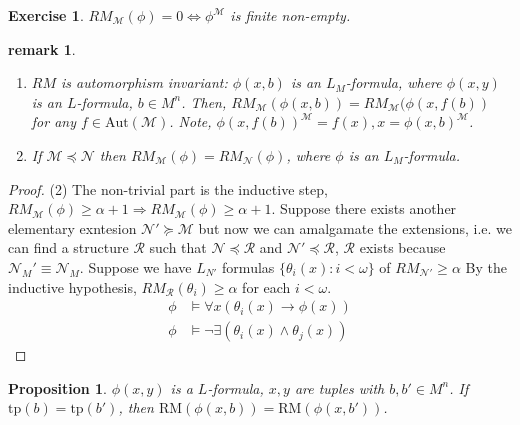 \documentclass[letterpaper, 12pt]{article}
\newcommand{\fin}{\qquad \quad \hfill \framebox[1.75mm][l]{\,}}
\newcommand{\cR}{\mathcal{R}}
\newcommand{\cM}{\mathcal{M}}
\newcommand{\cN}{\mathcal{N}}
\newcommand{\Aut}{\mbox{Aut}}
\newcommand{\tp}{\mbox{tp}}
\newcommand{\RM}{\mbox{RM}}
\theoremstyle{stdthm}
\newtheorem{prop}[thm]{Proposition}
\theoremstyle{stddef}
\newtheorem{rem}[thm]{remark} %
\theoremstyle{stdnonum}
\theoremstyle{stdqands}
\theoremstyle{stdbold}
\newtheorem{exercise}{Exercise}
\begin{document}
\begin{exercise}
$RM_\cM(\phi) = 0 \iff \phi^\cM$ is finite non-empty. 
\end{exercise}

\begin{rem}
\begin{enumerate}
\item $RM$ is automorphism invariant: $\phi(x,b)$ is an $L_M$-formula, where $\phi(x,y)$ is an $L$-formula, $b \in M^n$. Then, $RM_\cM(\phi(x,b)) = RM_\cM(\phi(x,f(b))$ for any $f \in \Aut(\cM)$.  Note, $\phi(x,f(b))^\cM = f(x), x = \phi(x,b)^\cM$. 
\item If $\cM \preceq \cN$ then $RM_\cM(\phi) = RM_\cN(\phi)$, where $\phi$ is an $L_M$-formula. 
\end{enumerate}
\end{rem}

\begin{proof}
(2) The non-trivial part is the inductive step, $RM_\cM(\phi) \geq \alpha + 1 \Rightarrow RM_\cM(\phi) \geq \alpha + 1$. Suppose there exists another elementary exntesion $\cN' \succeq \cM$ but now we can amalgamate the extensions, i.e. we can find a structure $\cR$ such that $\cN \preceq \cR$ and $\cN' \preceq \cR$, $\cR$ exists because $\cN_M'\equiv \cN_M$. Suppose we have $L_{N'}$ formulas $\{\theta_i(x): i < \omega\}$ of $RM_{\cN'}\geq \alpha$ By the inductive hypothesis, $RM_\cR(\theta_i) \geq \alpha$ for each $i < \omega$. 
\begin{align*}
\phi &\models \forall x(\theta_i(x) \to \phi(x))\\
\phi &\models \neg \exists (\theta_i (x) \wedge \theta_j(x))
\end{align*}
\end{proof}

\begin{prop} \label{prop3}
$\phi(x,y)$ is a $L$-formula, $x,y$ are tuples with $b,b' \in M^n$. If $\tp(b) = \tp(b')$, then $\RM(\phi(x,b)) = \RM(\phi(x,b'))$.  
\end{prop}
\end{document}
